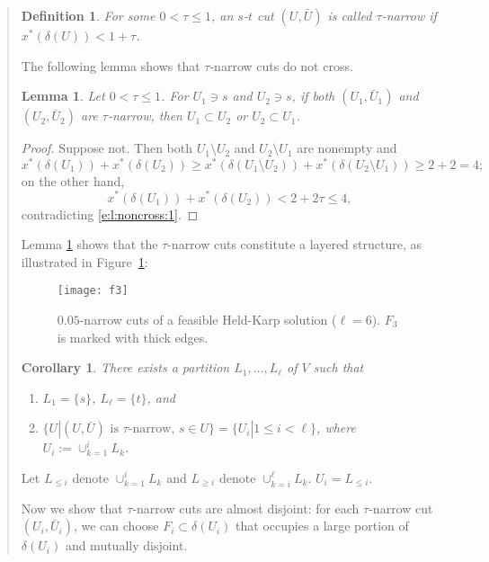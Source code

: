 \documentclass[11pt,letterpaper]{article}
\newtheorem{lemma}{Lemma}
\newtheorem{cor}{Corollary}
\newtheorem{defn}{Definition}
\newcommand{\st}{\mbox{$s$-$t$} }
\begin{document}
\begin{quote}
\begin{defn}
For some $0< \tau\leq 1$, an \st cut $(U,\bar U)$ is called \emph{$\tau$-narrow} if $x^*(\delta(U))<1+\tau$.
\end{defn}

The following lemma shows that $\tau$-narrow cuts do not cross.

\begin{lemma}\label{l:noncross}
Let $0< \tau\leq 1$. For $U_1 \ni s$ and $U_2 \ni s$, if both $(U_1 ,\bar U_1)$ and $(U_2 ,\bar U_2)$ are $\tau$-narrow, then $U_1\subset U_2$ or $U_2\subset U_1$.
\end{lemma}
\begin{proof}
Suppose not. Then both $U_1\setminus U_2$ and $U_2\setminus U_1$ are nonempty and\begin{equation}\label{e:l:noncross:1}
x^*(\delta(U_1))+x^*(\delta(U_2))\geq x^*(\delta(U_1\setminus U_2))+x^*(\delta(U_2\setminus U_1))\geq 2+2=4
;\end{equation}on the other hand,\begin{equation*}
x^*(\delta(U_1))+x^*(\delta(U_2)) < 2+2\tau \leq 4
,\end{equation*}contradicting \eqref{e:l:noncross:1}.
\end{proof}

Lemma \ref{l:noncross} shows that the $\tau$-narrow cuts constitute a layered structure, as illustrated in Figure~\ref{f:layer}:
\begin{figure}
\center
\texttt{[image: f3]}
\caption{$0.05$-narrow cuts of a feasible Held-Karp solution ($\ell=6$). $F_3$ is marked with thick edges.}
\label{f:layer}
\end{figure}

\begin{cor}\label{c:layer}
There exists a partition $L_1,\ldots,L_\ell$ of $V$ such that\begin{enumerate}
\item $L_1=\{s\}$, $L_\ell=\{t\}$, and
\item $\{U|(U,\bar U)\textrm{ is }\tau\textrm{-narrow, }s\in U\}=\{U_i |1\leq i<\ell\}$, where $U_i := \cup_{k=1}^i L_k$.
\end{enumerate}
\end{cor}

Let $L_{\leq i}$ denote $\cup_{k=1}^i L_k$ and $L_{\geq i}$ denote $\cup_{k=i}^\ell L_k$. $U_i = L_{\leq i}$.

Now we show that $\tau$-narrow cuts are almost disjoint: for each $\tau$-narrow cut $(U_i,\bar U_i)$, we can choose $F_i\subset\delta(U_i)$ that occupies a large portion of $\delta(U_i)$ and mutually disjoint.


\end{quote}
\end{document}
